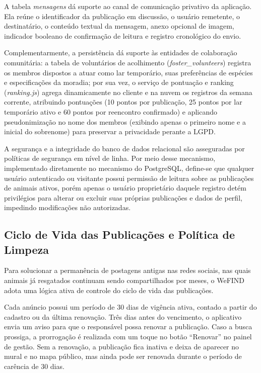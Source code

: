 A tabela \textit{mensagens} dá suporte ao canal de comunicação privativo da aplicação. Ela reúne o identificador da publicação em discussão, o usuário remetente, o destinatário, o conteúdo textual da mensagem, anexo opcional de imagem, indicador booleano de confirmação de leitura e registro cronológico do envio.

Complementarmente, a persistência dá suporte às entidades de colaboração comunitária: a tabela de voluntários de acolhimento (\textit{foster\_volunteers}) registra os membros dispostos a atuar como lar temporário, suas preferências de espécies e especificações da moradia; por sua vez, o serviço de pontuação e ranking (\textit{ranking.js}) agrega dinamicamente no cliente e na nuvem os registros da semana corrente, atribuindo pontuações (10 pontos por publicação, 25 pontos por lar temporário ativo e 60 pontos por reencontro confirmado) e aplicando pseudonimização no nome dos membros (exibindo apenas o primeiro nome e a inicial do sobrenome) para preservar a privacidade perante a LGPD.

A segurança e a integridade do banco de dados relacional são asseguradas por políticas de segurança em nível de linha. Por meio desse mecanismo, implementado diretamente no mecanismo do PostgreSQL, define-se que qualquer usuário autenticado ou visitante possui permissão de leitura sobre as publicações de animais ativos, porém apenas o usuário proprietário daquele registro detém privilégios para alterar ou excluir suas próprias publicações e dados de perfil, impedindo modificações não autorizadas.

\subsection{Ciclo de Vida das Publicações e Política de Limpeza}

Para solucionar a permanência de postagens antigas nas redes sociais, nas quais animais já resgatados continuam sendo compartilhados por meses, o WeFIND adota uma lógica ativa de controle do ciclo de vida das publicações.

Cada anúncio possui um período de 30 dias de vigência ativa, contado a partir do cadastro ou da última renovação. Três dias antes do vencimento, o aplicativo envia um aviso para que o responsável possa renovar a publicação. Caso a busca prossiga, a prorrogação é realizada com um toque no botão ``Renovar'' no painel de gestão. Sem a renovação, a publicação fica inativa e deixa de aparecer no mural e no mapa público, mas ainda pode ser renovada durante o período de carência de 30 dias.

